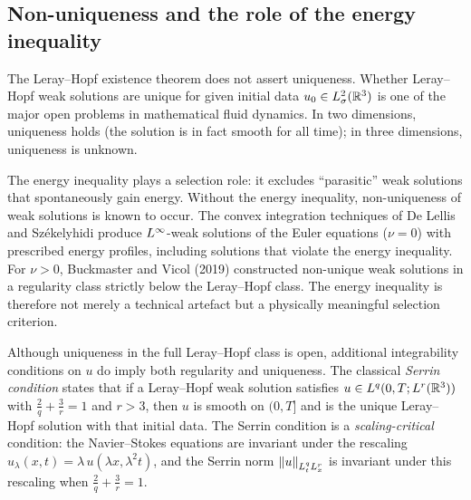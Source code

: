 \subsection{Non-uniqueness and the role of the energy inequality}

\begin{remark}\label{rem:uniqueness-open}
  The Leray--Hopf existence theorem does not assert uniqueness.  Whether Leray--Hopf weak
  solutions are unique for given initial data $u_{0} \in L^{2}_\sigma(\mathbb{R}^{3})$ is one of the
  major open problems in mathematical fluid dynamics.  In two dimensions, uniqueness holds
  (the solution is in fact smooth for all time); in three dimensions, uniqueness is
  unknown.

  The energy inequality plays a selection role: it excludes ``parasitic'' weak solutions
  that spontaneously gain energy.  Without the energy inequality, non-uniqueness of weak
  solutions is known to occur.  The convex integration techniques of De Lellis and
  Sz\'{e}kelyhidi produce $L^{\infty}$-weak solutions of the Euler equations
  ($\nu = 0$) with prescribed energy profiles, including solutions that violate the
  energy inequality.  For $\nu > 0$, Buckmaster and Vicol (2019) constructed non-unique
  weak solutions in a regularity class strictly below the Leray--Hopf class.  The energy
  inequality is therefore not merely a technical artefact but a physically meaningful
  selection criterion.
\end{remark}

\begin{remark}\label{rem:serrin}
  Although uniqueness in the full Leray--Hopf class is open, additional integrability
  conditions on $u$ do imply both regularity and uniqueness.  The classical
  \emph{Serrin condition} states that if a Leray--Hopf weak solution satisfies
  $u \in L^{q}(0, T; L^{r}(\mathbb{R}^{3}))$ with $\frac{2}{q} + \frac{3}{r} = 1$ and
  $r > 3$, then $u$ is smooth on $(0, T]$ and is the unique Leray--Hopf solution with
  that initial data.  The Serrin condition is a \emph{scaling-critical} condition: the
  Navier--Stokes equations are invariant under the rescaling
  $u_{\lambda}(x, t) = \lambda\,u(\lambda x, \lambda^{2} t)$, and the Serrin norm
  $\left\lVert u \right\rVert_{L^{q}_{t}L^{r}_{x}}$ is invariant under this rescaling when
  $\frac{2}{q} + \frac{3}{r} = 1$.
\end{remark}

